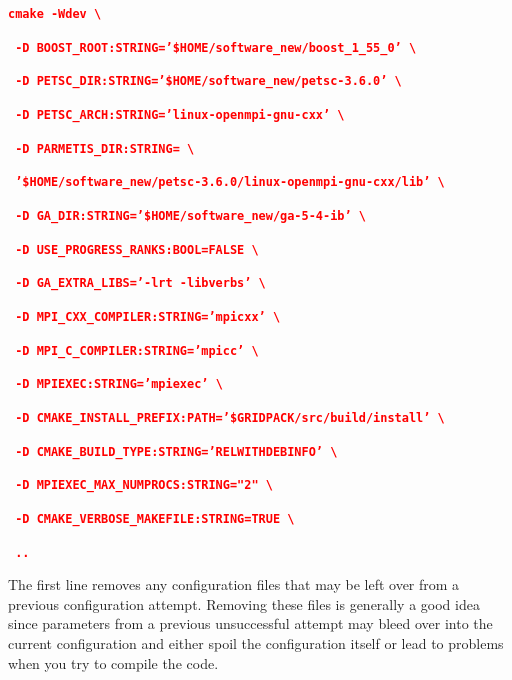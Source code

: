 \documentclass[12pt]{report} %
\begin{document}
\textcolor{red}{\texttt{\textbf{}}}

\textcolor{red}{\texttt{\textbf{cmake -Wdev {\textbackslash}}}}

\textcolor{red}{\texttt{\textbf{      -D BOOST\_ROOT:STRING='\$HOME/software\_new/boost\_1\_55\_0' {\textbackslash}}}}

\textcolor{red}{\texttt{\textbf{      -D PETSC\_DIR:STRING='\$HOME/software\_new/petsc-3.6.0' {\textbackslash}}}}

\textcolor{red}{\texttt{\textbf{      -D PETSC\_ARCH:STRING='linux-openmpi-gnu-cxx' {\textbackslash}}}}

\textcolor{red}{\texttt{\textbf{      -D PARMETIS\_DIR:STRING= {\textbackslash}}}}

\textcolor{red}{\texttt{\textbf{        '\$HOME/software\_new/petsc-3.6.0/linux-openmpi-gnu-cxx/lib' {\textbackslash}}}}

\textcolor{red}{\texttt{\textbf{      -D GA\_DIR:STRING='\$HOME/software\_new/ga-5-4-ib' {\textbackslash}}}}

\textcolor{red}{\texttt{\textbf{      -D USE\_PROGRESS\_RANKS:BOOL=FALSE {\textbackslash}}}}

\textcolor{red}{\texttt{\textbf{      -D GA\_EXTRA\_LIBS='-lrt -libverbs' {\textbackslash}}}}

\textcolor{red}{\texttt{\textbf{      -D MPI\_CXX\_COMPILER:STRING='mpicxx' {\textbackslash}}}}

\textcolor{red}{\texttt{\textbf{      -D MPI\_C\_COMPILER:STRING='mpicc' {\textbackslash}}}}

\textcolor{red}{\texttt{\textbf{      -D MPIEXEC:STRING='mpiexec' {\textbackslash}}}}

\textcolor{red}{\texttt{\textbf{      -D CMAKE\_INSTALL\_PREFIX:PATH='\$GRIDPACK/src/build/install' {\textbackslash}}}}

\textcolor{red}{\texttt{\textbf{      -D CMAKE\_BUILD\_TYPE:STRING='RELWITHDEBINFO' {\textbackslash}}}}

\textcolor{red}{\texttt{\textbf{      -D MPIEXEC\_MAX\_NUMPROCS:STRING="2" {\textbackslash}}}}

\textcolor{red}{\texttt{\textbf{      -D CMAKE\_VERBOSE\_MAKEFILE:STRING=TRUE {\textbackslash}}}}

\textcolor{red}{\texttt{\textbf{      ..}}}

The first line removes any configuration files that may be left over from a previous configuration attempt. Removing these files is generally a good idea since parameters from a previous unsuccessful attempt may bleed over into the current configuration and either spoil the configuration itself or lead to problems when you try to compile the code. 
\end{document}
